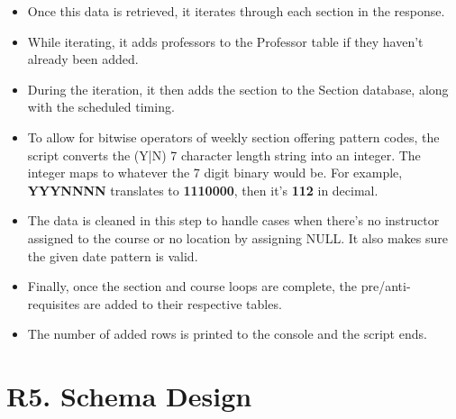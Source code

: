 \documentclass[12pt, a4paper]{article}
\begin{document}
\begin{itemize}
    \item Once this data is retrieved, it iterates through each section in the response.
    \item While iterating, it adds professors to the Professor table if they haven't already been added.
    \item During the iteration, it then adds the section to the Section database, along with the scheduled timing.
    \item To allow for bitwise operators of weekly section offering pattern codes, the script converts the (Y|N) 7 character length string into an integer. The integer maps to whatever the 7 digit binary would be. For example, \textbf{YYYNNNN} translates to \textbf{1110000}, then it's \textbf{112} in decimal.
    \item The data is cleaned in this step to handle cases when there's no instructor assigned to the course or no location by assigning NULL. It also makes sure the given date pattern is valid.
    \item Finally, once the section and course loops are complete, the pre/anti-requisites are added to their respective tables.
    \item The number of added rows is printed to the console and the script ends.
\end{itemize}
\section*{R5. Schema Design}
\label{sec:R5}
\end{document}
